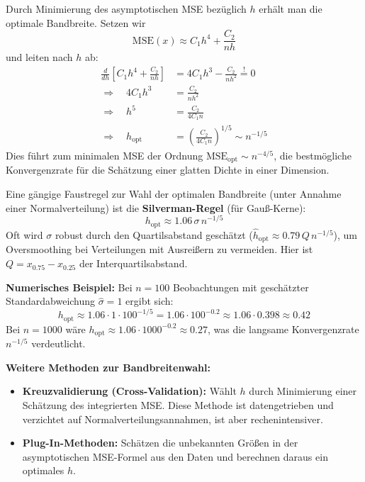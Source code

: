 \documentclass[a4paper, 11pt]{scrartcl}
\begin{document}
Durch Minimierung des asymptotischen MSE bezüglich $h$ erhält man die optimale Bandbreite. Setzen wir
\[
\text{MSE}(x) \approx C_1 h^4 + \frac{C_2}{nh}
\]
und leiten nach $h$ ab:
\begin{align*}
	\frac{d}{dh}\left[C_1 h^4 + \frac{C_2}{nh}\right] &= 4C_1 h^3 - \frac{C_2}{nh^2} \stackrel{!}{=} 0 \\
	\Rightarrow \quad 4C_1 h^3 &= \frac{C_2}{nh^2} \\
	\Rightarrow \quad h^5 &= \frac{C_2}{4C_1 n} \\
	\Rightarrow \quad h_{\text{opt}} &= \left(\frac{C_2}{4C_1 n}\right)^{1/5} \sim n^{-1/5}
\end{align*}
Dies führt zum minimalen MSE der Ordnung $\text{MSE}_{\text{opt}} \sim n^{-4/5}$, die bestmögliche Konvergenzrate für die Schätzung einer glatten Dichte in einer Dimension.

Eine gängige Faustregel zur Wahl der optimalen Bandbreite (unter Annahme einer Normalverteilung) ist die \textbf{Silverman-Regel} \cite{Silverman1986} (für Gauß-Kerne):
\begin{equation}
	h_{\text{opt}} \approx 1.06 \, \sigma \, n^{-1/5}
\end{equation}
Oft wird $\sigma$ robust durch den Quartilsabstand geschätzt ($\hat{h}_{\text{opt}} \approx 0.79 \, Q \, n^{-1/5}$), um Oversmoothing bei Verteilungen mit Ausreißern zu vermeiden. Hier ist $Q = x_{0.75} - x_{0.25}$ der Interquartilsabstand.

\textbf{Numerisches Beispiel:} Bei $n = 100$ Beobachtungen mit geschätzter Standardabweichung $\hat{\sigma} = 1$ ergibt sich:
\[
h_{\text{opt}} \approx 1.06 \cdot 1 \cdot 100^{-1/5} = 1.06 \cdot 100^{-0.2} \approx 1.06 \cdot 0.398 \approx 0.42
\]
Bei $n = 1000$ wäre $h_{\text{opt}} \approx 1.06 \cdot 1000^{-0.2} \approx 0.27$, was die langsame Konvergenzrate $n^{-1/5}$ verdeutlicht.

\textbf{Weitere Methoden zur Bandbreitenwahl:}
\begin{itemize}
	\item \textbf{Kreuzvalidierung (Cross-Validation):} Wählt $h$ durch Minimierung einer Schätzung des integrierten MSE. Diese Methode ist datengetrieben und verzichtet auf Normalverteilungsannahmen, ist aber rechenintensiver.
	\item \textbf{Plug-In-Methoden:} Schätzen die unbekannten Größen in der asymptotischen MSE-Formel aus den Daten und berechnen daraus ein optimales $h$.
\end{itemize}
\end{document}
